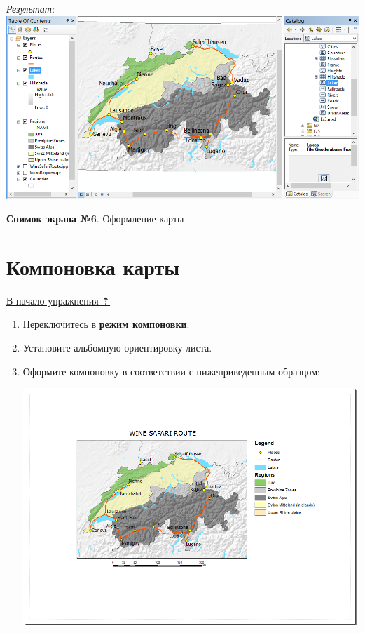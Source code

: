 \documentclass[]{book}
\theoremstyle{definition}
\theoremstyle{definition}
\theoremstyle{definition}
\theoremstyle{remark}
\begin{document}
\begin{enumerate}
  \emph{Результат}: \includegraphics{images/Ex05/image36.png}
\end{enumerate}

\textbf{Снимок экрана №6}. Оформление карты

\hypertarget{map-ref-general-layout}{%
\section{Компоновка карты}\label{map-ref-general-layout}}

\protect\hyperlink{map-ref-general}{В начало упражнения ⇡}

\begin{enumerate}
\def\labelenumi{\arabic{enumi}.}
\item
  Переключитесь в \textbf{режим компоновки}.
\item
  Установите альбомную ориентировку листа.
\item
  Оформите компоновку в соответствии с нижеприведенным образцом:

  \includegraphics{images/Ex05/image37.png}
\end{enumerate}
\end{document}

